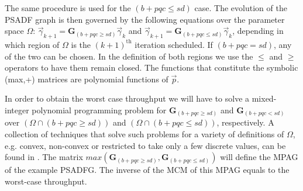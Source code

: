 \documentclass[]{eptcs}
\begin{document}
The same procedure is used for the  $(b+pqc \le sd)$ case.
The evolution of the PSADF graph is then governed by the following equations over the parameter space $\Omega$: $\vec{\gamma}_{k+1}=\mathbf{G}_{(b+pqc \geq sd)} \vec{\gamma}_{k}$ and $\vec{\gamma}_{k+1}=\mathbf{G}_{(b+pqc \le sd)} \vec{\gamma}_{k}$, depending in which region of $\Omega$ is the $(k+1)^{\mathrm{th}}$ iteration scheduled. If $(b+pqc = sd)$, any of the two can be chosen. In the definition of both regions we use the $\le$ and $\ge$ operators to have them remain closed. The functions that constitute the symbolic (max,+) matrices are polynomial functions of $\vec{p}$.

In order to obtain the worst case throughput we will have to solve a mixed-integer polynomial programming problem for $\mathbf{G}_{(b+pqc \geq sd)}$ and $\mathbf{G}_{(b+pqc < sd)}$ over $(\Omega \cap (b+pqc \geq sd))$ and $(\Omega \cap (b+pqc \leq sd))$, respectively. A collection of techniques that solve such problems for a variety of definitions of $\Omega$, e.g. convex, non-convex or restricted to take only a few discrete values, can be found in \cite{2sher:all}. The matrix $\mathit{max}\left(\mathbf{G}_{(b+pqc \geq sd)}, \mathbf{G}_{(b+pqc \le sd)}\right)$ will define the MPAG of the example PSADFG. The inverse of the MCM of this MPAG equals to the worst-case throughput.
\end{document}
